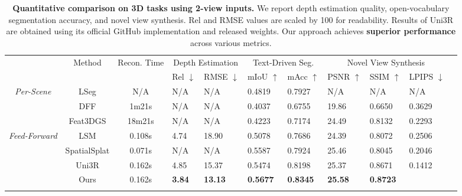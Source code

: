 \documentclass[runningheads]{llncs}
\begin{document}
\begin{table}[t]
\renewcommand{\arraystretch}{1.1}
\centering 
\caption{
\textbf{Quantitative comparison on 3D tasks using 2-view inputs.} 
We report depth estimation quality, open-vocabulary segmentation accuracy, and novel view synthesis. 
Rel and RMSE values are scaled by 100 for readability. 
Results of Uni3R are obtained using its official GitHub implementation and released weights. 
Our approach achieves {\textbf{superior performance}} across various metrics.   
}  
\vspace{-3mm}
\label{table:SOTA_full_2views}
\begin{adjustbox} {width=.99\linewidth}
\begin{tabular}{ c | c | c | p{1.3cm}<{\centering} p{1.3cm}<{\centering} | p{1.4cm}<{\centering} p{1.4cm}<{\centering} | p{1.3cm}<{\centering} p{1.3cm}<{\centering}  p{1.3cm}<{\centering} p{1.3cm}<{\centering} }
\Xhline{3\arrayrulewidth}
\multirow{2}{*}{Type} & \multirow{2}{*}{Method} & \multirow{2}{*}{Recon. Time} & \multicolumn{2}{c|}{Depth Estimation} & \multicolumn{2}{c|}{Text-Driven Seg.} & \multicolumn{3}{c}{Novel View Synthesis}\\ 
 &  &  & Rel $\downarrow$ & RMSE $\downarrow$ & mIoU $\uparrow$ & mAcc $\uparrow$ & PSNR $\uparrow$ & SSIM $\uparrow$ & LPIPS $\downarrow$  \\  
\hline 
\multirow{3}{*}{\textit{Per-Scene}} 
&      LSeg        \cite{LSeg}   &  N/A   & N/A     & N/A     & 0.4819 & 0.7927 & N/A   & N/A    & N/A    \\
& DFF    \cite{DFF}              &  1m21s   & N/A     & N/A     & 0.4037 & 0.6755 & 19.86 & 0.6650 & 0.3629 \\
& Feat3DGS \cite{feature3dgs}    &  18m21s & N/A     & N/A     & 0.4223 & 0.7174 & 24.49 & 0.8132 & 0.2293 \\
\hline 
\multirow{4}{*}{\textit{Feed-Forward}} 
&  LSM \cite{lsm}      &   0.108s          & 4.74    & 18.90   & 0.5078 & 0.7686 & 24.39 & 0.8072 & 0.2506 \\
& SpatialSplat \cite{spatialsplat}  & 0.071s  & N/A     & N/A     & 0.5587 & 0.7924 & 25.46 & 0.8045 & 0.2046 \\
& Uni3R \cite{uni3r}          &  0.162s  & 4.85    & 15.37   & 0.5474 & 0.8198 & 25.37 & 0.8671 & 0.1412 \\
&  \cellcolor{lightblue}Ours  &  \cellcolor{lightblue}0.162s
& \cellcolor{lightblue}\textbf{3.84}   & \cellcolor{lightblue}\textbf{13.13} 
& \cellcolor{lightblue}\textbf{0.5677} & \cellcolor{lightblue}\textbf{0.8345} 
& \cellcolor{lightblue}\textbf{25.58}  & \cellcolor{lightblue}\textbf{0.8723} & \cellcolor{lightblue}{\textbf{0.1397}}  \\  
\Xhline{3\arrayrulewidth}
\end{tabular}
\end{adjustbox}
\end{table}
\end{document}
